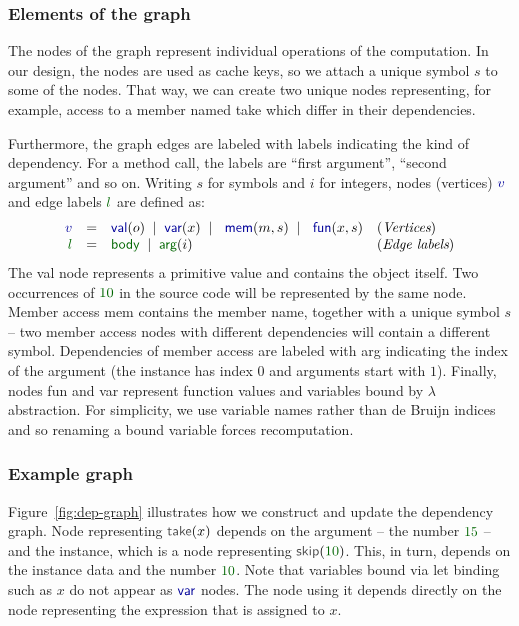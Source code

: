 \documentclass[acmsmall,anonymous,fleqn]{acmart}\settopmatter{printfolios=false,printccs=false,printacmref=false}
\theoremstyle{plain}
\theoremstyle{definition}
\newcommand{\lsep}{\;\;|\;\;}
\newcommand{\num}[1]{\textcolor{numclr}{#1}}
\newcommand{\ident}[1]{\textnormal{\textcolor{idclr}{\sffamily #1}}}
\newcommand{\kvd}[1]{\textnormal{\textcolor{kvdclr}{\sffamily #1}}}
\newcommand{\bndclr}[1]{\textcolor{kvdclr}{#1}}
\newcommand{\blblclr}[1]{\textcolor{numclr}{#1}}
\newcommand{\bnd}[1]{\textnormal{\textcolor{kvdclr}{\sffamily #1}}}
\newcommand{\blbl}[1]{\textnormal{\textcolor{numclr}{\sffamily #1}}}
\begin{document}

\subsubsection{Elements of the graph}
The nodes of the graph represent individual operations of the computation. In our design, the nodes
are used as cache keys, so we attach a unique symbol $s$ to some of the nodes. That way, we can
create two unique nodes representing, for example, access to a member named \ident{take} which
differ in their dependencies.

Furthermore, the graph edges are labeled with labels indicating the kind of dependency. For
a method call, the labels are ``first argument'', ``second argument'' and so on. Writing
$s$ for symbols and $i$ for integers, nodes (vertices) $\bndclr{v}$ and edge labels $\blblclr{l}$
are defined as:
%
\begin{equation*}
\begin{array}{rcll}
\bndclr{v}&=&\bnd{val}(o) \lsep \bnd{var}(x)\lsep \bnd{mem}(m, s)\lsep \bnd{fun}(x, s)&(\textit{Vertices})\\
\blblclr{l}&=&\blbl{body} \lsep \blbl{arg}(i)&(\textit{Edge labels})\\
\end{array}
\end{equation*}
%
The \bnd{val} node represents a primitive value and contains the object itself. Two occurrences
of $\num{10}$ in the source code will be represented by the same node. Member access \bnd{mem}
contains the member name, together with a unique symbol $s$ -- two member access nodes with
different dependencies will contain a different symbol. Dependencies of member access are labeled
with \blbl{arg} indicating the index of the argument (the instance has index $0$ and arguments
start with $1$). Finally, nodes \bnd{fun} and \bnd{var} represent function values and variables
bound by $\lambda$ abstraction. For simplicity, we use variable names rather than de Bruijn
indices and so renaming a bound variable forces recomputation.


\subsubsection{Example graph}
Figure~\ref{fig:dep-graph} illustrates how we construct and update the
dependency graph. Node representing $\ident{take}(x)$ depends on the argument -- the
number $\num{15}$ -- and the instance, which is a node representing $\ident{skip}(\num{10})$.
This, in turn, depends on the instance \ident{data} and the number $\num{10}$. Note that variables
bound via \kvd{let} binding such as $x$ do not appear as $\bnd{var}$ nodes. The node using it
depends directly on the node representing the expression that is assigned to $x$.
\end{document}
